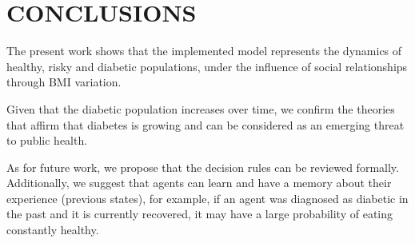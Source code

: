 \section{CONCLUSIONS}
The present work shows that the implemented model represents the dynamics of healthy, risky and diabetic populations, under the influence of social relationships through BMI variation. 

Given that the diabetic population increases over time, we confirm the theories that affirm that diabetes is growing and can be considered as an emerging threat to public health.

As for future work, we propose that the decision rules can be reviewed formally. Additionally, we suggest that agents can learn and have a memory about their experience (previous states), for example, if an agent was diagnosed as diabetic in the past and it is currently recovered, it may have a large probability of eating constantly healthy.
